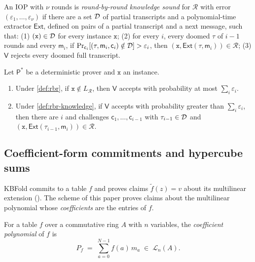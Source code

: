 \begin{definition}\label{def:rbr-knowledge}
An IOP with $\nu$ rounds is \emph{round-by-round knowledge sound} for $\mathcal{R}$ with error $(\varepsilon_1,\dots,\varepsilon_\nu)$ if there are a set $\mathcal{D}$ of partial transcripts and a polynomial-time extractor $\mathsf{Ext}$, defined on pairs of a partial transcript and a next message, such that:
(1) $(\mathtt{x}) \in \mathcal{D}$ for every instance $\mathtt{x}$;
(2) for every $i$, every doomed $\tau$ of $i-1$ rounds and every $\mathsf{m}_i$, if $\Pr_{\mathsf{c}_i}[(\tau,\mathsf{m}_i,\mathsf{c}_i) \notin \mathcal{D}] > \varepsilon_i$, then $(\mathtt{x}, \mathsf{Ext}(\tau,\mathsf{m}_i)) \in \mathcal{R}$;
(3) $\mathsf{V}$ rejects every doomed full transcript.
\end{definition}

\begin{lemma}\label{lem:rbr-overall}
Let $\mathsf{P}^*$ be a deterministic prover and $\mathtt{x}$ an instance.
\begin{enumerate}
  \item Under \cref{def:rbr}, if $\mathtt{x} \notin L_{\mathcal{R}}$, then $\mathsf{V}$ accepts with probability at most $\sum_i \varepsilon_i$.
  \item Under \cref{def:rbr-knowledge}, if $\mathsf{V}$ accepts with probability greater than $\sum_i \varepsilon_i$, then there are $i$ and challenges $\mathsf{c}_1,\dots,\mathsf{c}_{i-1}$ with $\tau_{i-1} \in \mathcal{D}$ and $(\mathtt{x}, \mathsf{Ext}(\tau_{i-1},\mathsf{m}_i)) \in \mathcal{R}$.
\end{enumerate}
\end{lemma}

\subsection{Coefficient-form commitments and hypercube sums}\label{sec:proofs:pcs}

KBFold commits to a table $f$ and proves claims $\tilde f(z) = v$ about its multilinear extension ().
The scheme of this paper proves claims about the multilinear polynomial whose \emph{coefficients} are the entries of $f$.

\begin{definition}\label{def:coeff-poly}
For a table $f$ over a commutative ring $A$ with $n$ variables, the \emph{coefficient polynomial} of $f$ is
\[
  P_f \;=\; \sum_{a=0}^{N-1} f(a)\, m_a \;\in\; \mathcal{L}_n(A).
\]
\end{definition}

